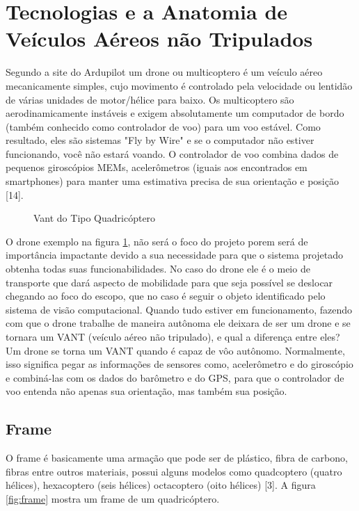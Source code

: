\section{Tecnologias e a Anatomia de Veículos Aéreos não Tripulados}
Segundo a site do Ardupilot um drone ou multicoptero é um veículo aéreo mecanicamente simples, cujo movimento é controlado pela velocidade ou lentidão de várias unidades de motor/hélice para baixo.
Os multicoptero são aerodinamicamente instáveis e exigem absolutamente um computador de bordo (também conhecido como controlador de voo) para um voo estável. Como resultado, eles são sistemas "Fly by Wire" e se o computador não estiver funcionando, você não estará voando. O controlador de voo combina dados de pequenos giroscópios MEMs, acelerômetros (iguais aos encontrados em smartphones) para manter uma estimativa precisa de sua orientação e posição [14].

%
\begin{figure}[H]
	\centering
	\caption{Vant do Tipo Quadricóptero}
	\fontsize{9pt}{12pt}\selectfont
	\def\svgwidth{15cm}
	
	\label{fig:quad}
\end{figure}

O drone exemplo na figura \ref{fig:quad}, não será o foco do projeto porem será de importância impactante devido a sua necessidade para que o sistema projetado obtenha todas suas funcionabilidades. No caso do drone ele é o meio de transporte que dará aspecto de mobilidade para que seja possível se deslocar chegando ao foco do escopo, que no caso é seguir o objeto identificado pelo sistema de visão computacional.
Quando tudo estiver em funcionamento, fazendo com que o drone trabalhe de maneira autônoma ele deixara de ser um drone e se tornara um VANT (veículo aéreo não tripulado), e qual a diferença entre eles? Um drone se torna um VANT quando é capaz de vôo autônomo. Normalmente, isso significa pegar as informações de sensores como, acelerômetro e do giroscópio e combiná-las com os dados do barômetro e do GPS, para que o controlador de voo entenda não apenas sua orientação, mas também sua posição.

\subsection{Frame}
O frame é basicamente uma armação que pode ser de plástico, fibra de carbono, fibras entre outros materiais, possui alguns modelos como quadcoptero (quatro hélices), hexacoptero (seis hélices) octacoptero (oito hélices) [3]. A figura \ref{fig:frame} mostra um frame de um quadricóptero.

